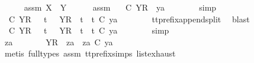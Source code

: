 \begin{isabellebody}
\ \ \ \ \isamarkupfalse%
\ assm{}{\isacharcolon}\ {\isachardoublequoteopen}X\ {\isasymsubseteq}\ Y{\isachardoublequoteclose}\isanewline
\ \ \ \ \isamarkupfalse%
\ assm{}\ \isamarkupfalse%
\ {\isachardoublequoteopen}{\isasymsigma}{\isacharprime}\ {\isasymle}\isactrlsub C\ {\isacharbrackleft}{\isacharbrackleft}Y{\isacharbrackright}\isactrlsub R{\isacharbrackright}\ {\isacharat}\ ya{\isachardoublequoteclose}\isanewline
\ \ \ \ \ \ \isamarkupfalse%
\ simp\isanewline
\ \ \ \ \isamarkupfalse%
\ \isamarkupfalse%
\ {\isachardoublequoteopen}{\isasymsigma}{\isacharprime}\ {\isasymle}\isactrlsub C\ {\isacharbrackleft}{\isacharbrackleft}Y{\isacharbrackright}\isactrlsub R{\isacharbrackright}\ \ {\isasymor}\ {\isacharparenleft}{\isasymexists}t{\isacharprime}{\isachardot}\ {\isasymsigma}{\isacharprime}\ {\isacharequal}\ {\isacharbrackleft}{\isacharbrackleft}Y{\isacharbrackright}\isactrlsub R{\isacharbrackright}\ {\isacharat}\ t{\isacharprime}\ {\isasymand}\ t{\isacharprime}\ {\isasymle}\isactrlsub C\ ya{\isacharparenright}{\isachardoublequoteclose}\isanewline
\ \ \ \ \ \ \isamarkupfalse%
\ tt{\isacharunderscore}prefix{\isacharunderscore}append{\isacharunderscore}split\ \isamarkupfalse%
\ blast\isanewline
\ \ \ \ \isamarkupfalse%
\ \isamarkupfalse%
\ {\isachardoublequoteopen}{\isasymsigma}{\isacharprime}\ {\isasymle}\isactrlsub C\ {\isacharbrackleft}{\isacharbrackleft}Y{\isacharbrackright}\isactrlsub R{\isacharbrackright}\ \ {\isasymor}\ {\isacharparenleft}{\isasymexists}t{\isacharprime}{\isachardot}\ {\isasymsigma}{\isacharprime}\ {\isacharequal}\ {\isacharbrackleft}Y{\isacharbrackright}\isactrlsub R\ {\isacharhash}\ t{\isacharprime}\ {\isasymand}\ t{\isacharprime}\ {\isasymle}\isactrlsub C\ ya{\isacharparenright}{\isachardoublequoteclose}\isanewline
\ \ \ \ \ \ \isamarkupfalse%
\ simp\isanewline
\ \ \ \ \isamarkupfalse%
\ \isamarkupfalse%
\ za\ \ {\isachardoublequoteopen}{\isasymsigma}{\isacharprime}\ {\isacharequal}\ {\isacharbrackleft}{\isacharbrackright}\ {\isasymor}\ {\isacharparenleft}{\isasymsigma}{\isacharprime}\ {\isacharequal}\ {\isacharbrackleft}Y{\isacharbrackright}\isactrlsub R\ {\isacharhash}\ za\ {\isasymand}\ za\ {\isasymle}\isactrlsub C\ ya{\isacharparenright}{\isachardoublequoteclose}\isanewline
\ \ \ \ \ \ \isamarkupfalse%
\ {\isacharparenleft}metis\ {\isacharparenleft}full{\isacharunderscore}types{\isacharparenright}\ assm{}\ tt{\isacharunderscore}prefix{\isachardot}simps{\isacharparenleft}{}{\isacharparenright}\ list{\isachardot}exhaust{\isacharparenright}\isanewline

\end{isabellebody}
